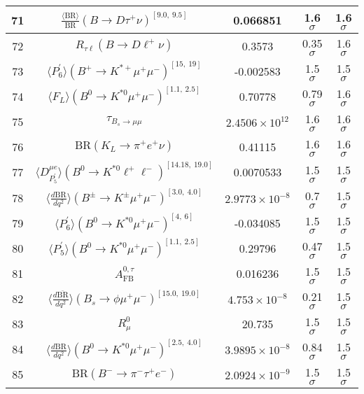 \begin{longtable}{|c|c|c|c|c|}
71 &	 $\frac{\langle \mathrm{BR} \rangle}{\mathrm{BR}}(B\to D\tau^+\nu)^{[9.0,\  9.5]}$ &	 0.066851 &	 \cellcolor{green!0}1.6 $ \sigma$ &	 1.6 $ \sigma$ \\ \hline
72 &	 $R_{\tau \ell}(B\to D\ell^+\nu)$ &	 0.3573 &	 \cellcolor{green!50}0.35 $ \sigma$ &	 1.6 $ \sigma$ \\ \hline
73 &	 $\langle P_6^\prime\rangle(B^+\to K^{\ast +}\mu^+\mu^-)^{[15,\  19]}$ &	 -0.002583 &	 \cellcolor{green!0}1.5 $ \sigma$ &	 1.5 $ \sigma$ \\ \hline
74 &	 $\langle F_L\rangle(B^0\to K^{\ast 0}\mu^+\mu^-)^{[1.1,\  2.5]}$ &	 0.70778 &	 \cellcolor{green!39}0.79 $ \sigma$ &	 1.6 $ \sigma$ \\ \hline
75 &	 $\tau_{B_s \to \mu\mu}$ &	 $2.4506\times 10^{12}$ &	 \cellcolor{red!0}1.6 $ \sigma$ &	 1.6 $ \sigma$ \\ \hline
76 &	 $\mathrm{BR}(K_L\to \pi^+e^+\nu)$ &	 0.41115 &	 \cellcolor{red!0}1.6 $ \sigma$ &	 1.6 $ \sigma$ \\ \hline
77 &	 $\langle D_{P_5^\prime}^{\mu e} \rangle(B^0\to K^{\ast 0}\ell^+\ell^-)^{[14.18,\  19.0]}$ &	 0.0070533 &	 \cellcolor{green!0}1.5 $ \sigma$ &	 1.5 $ \sigma$ \\ \hline
78 &	 $\langle \frac{d\mathrm{BR}}{dq^2} \rangle(B^\pm\to K^\pm \mu^+\mu^-)^{[3.0,\  4.0]}$ &	 $2.9773\times 10^{-8}$ &	 \cellcolor{green!41}0.7 $ \sigma$ &	 1.5 $ \sigma$ \\ \hline
79 &	 $\langle P_6^\prime\rangle(B^0\to K^{\ast 0}\mu^+\mu^-)^{[4,\  6]}$ &	 -0.034085 &	 \cellcolor{green!1}1.5 $ \sigma$ &	 1.5 $ \sigma$ \\ \hline
80 &	 $\langle P_5^\prime\rangle(B^0\to K^{\ast 0}\mu^+\mu^-)^{[1.1,\  2.5]}$ &	 0.29796 &	 \cellcolor{green!50}0.47 $ \sigma$ &	 1.5 $ \sigma$ \\ \hline
81 &	 $A_\mathrm{FB}^{0,\tau}$ &	 0.016236 &	 \cellcolor{green!0}1.5 $ \sigma$ &	 1.5 $ \sigma$ \\ \hline
82 &	 $\langle \frac{d\overline{\mathrm{BR}}}{dq^2} \rangle(B_s\to \phi \mu^+\mu^-)^{[15.0,\  19.0]}$ &	 $4.753\times 10^{-8}$ &	 \cellcolor{green!50}0.21 $ \sigma$ &	 1.5 $ \sigma$ \\ \hline
83 &	 $R_\mu^0$ &	 20.735 &	 \cellcolor{green!0}1.5 $ \sigma$ &	 1.5 $ \sigma$ \\ \hline
84 &	 $\langle \frac{d\mathrm{BR}}{dq^2} \rangle(B^0\to K^{\ast 0}\mu^+\mu^-)^{[2.5,\  4.0]}$ &	 $3.9895\times 10^{-8}$ &	 \cellcolor{green!31}0.84 $ \sigma$ &	 1.5 $ \sigma$ \\ \hline
85 &	 $\mathrm{BR}(B^-\to \pi^- \tau^+e^-)$ &	 $2.0924\times 10^{-9}$ &	 \cellcolor{green!0}1.5 $ \sigma$ &	 1.5 $ \sigma$ \\ \hline

\end{longtable}
